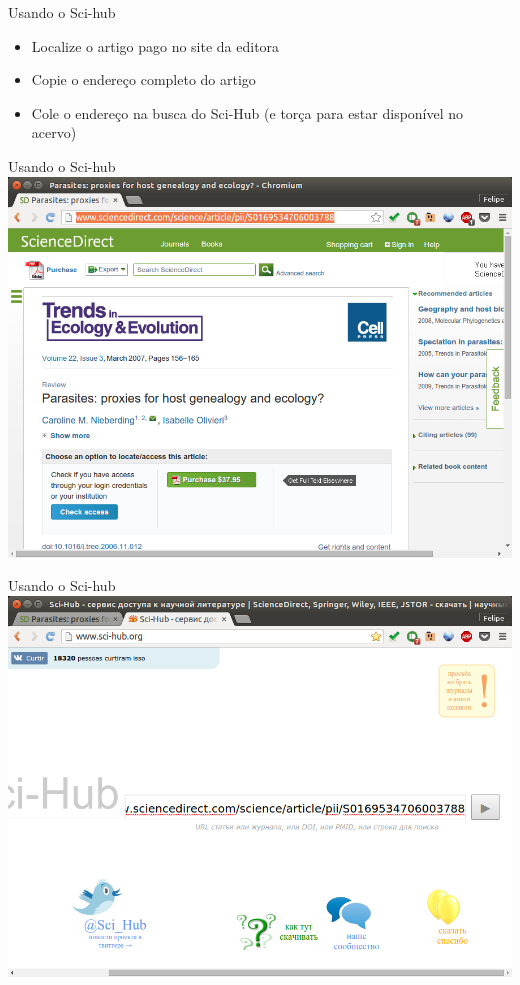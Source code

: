 \documentclass{beamer}
\begin{document}
\begin{frame}{Usando o Sci-hub}
  \begin{itemize}
  \item Localize o artigo pago no site da editora
  \item Copie o endereço completo do artigo
  \item Cole o endereço na busca do Sci-Hub (e torça para estar
    disponível no acervo)
  \end{itemize}
\end{frame}

\begin{frame}{Usando o Sci-hub}
  \includegraphics[height=.85\textheight]{Busca/scihub-busca1}
\end{frame}

\begin{frame}{Usando o Sci-hub}
  \includegraphics[height=.85\textheight]{Busca/scihub-busca2}
\end{frame}
\end{document}
